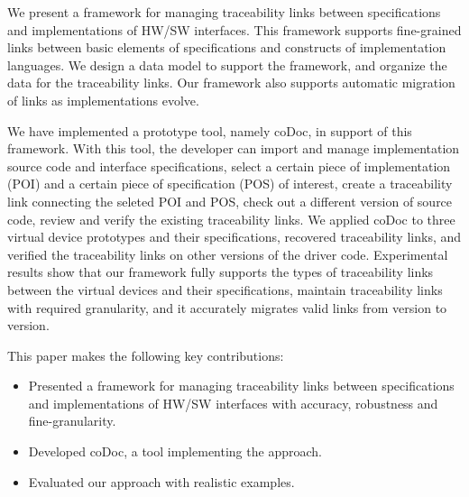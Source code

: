 
We present a framework for managing traceability links between specifications and implementations of HW/SW interfaces. 
This framework supports fine-grained links between basic elements of specifications and constructs of implementation languages.
We design a data model to support the framework, and organize the data for the traceability links.
Our framework also supports automatic migration of links as implementations evolve. 

We have implemented a prototype tool, namely coDoc, in support of this framework. 
With this tool, the developer can import and manage implementation source code and interface specifications, select a certain piece of implementation (POI) and a certain piece of specification (POS) of interest, create a traceability link connecting the seleted POI and POS, check out a different version of source code, review and verify the existing traceability links. 
We applied coDoc to three virtual device prototypes and their specifications, recovered traceability links, and verified the traceability links on other versions of the driver code.
Experimental results show that our framework fully supports the types of traceability links between the virtual devices and their specifications,
maintain traceability links with required granularity, 
and it accurately migrates valid links from version to version.

This paper makes the following key contributions:
\begin{itemize}
\item Presented a framework for managing traceability links between specifications and implementations of HW/SW interfaces with accuracy, robustness and fine-granularity.
\item Developed coDoc, a tool implementing the approach.
\item Evaluated our approach with realistic examples.
\end{itemize}

